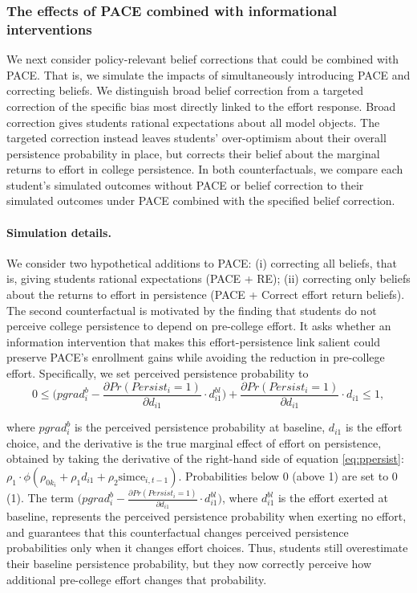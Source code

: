 \subsubsection{The effects of PACE combined with informational interventions}\label{sec:infointerventions}
We next consider policy-relevant belief corrections that could be combined with PACE. That is, we simulate the impacts of simultaneously introducing PACE and correcting beliefs. We distinguish broad belief correction from a targeted correction of the specific bias most directly linked to the effort response. Broad correction gives students rational expectations about all model objects. The targeted correction instead leaves students' over-optimism about their overall persistence probability in place, but corrects their belief about the marginal returns to effort in college persistence. In both counterfactuals, we compare each student's simulated outcomes without PACE or belief correction to their simulated outcomes under PACE combined with the specified belief correction.\par


\vspace{-1em}
\paragraph{Simulation details.} We consider two hypothetical additions to PACE: (i) correcting all beliefs, that is, giving students rational expectations (PACE + RE); (ii) correcting only beliefs about the returns to effort in persistence (PACE + Correct effort return beliefs). The second counterfactual is motivated by the finding that students do not perceive college persistence to depend on pre-college effort.  It asks whether an information intervention that makes this effort-persistence link salient could preserve PACE's enrollment gains while avoiding the reduction in pre-college effort. Specifically, we set perceived persistence probability to
$$0\leq \bigg(pgrad^b_i-\frac{\partial Pr(Persist_i=1) }{\partial d_{i1}}\cdot d_{i1}^{bl}\bigg)+\frac{\partial Pr(Persist_i=1) }{\partial d_{i1}}\cdot d_{i1} \leq1,$$ 

\noindent where $pgrad^b_i$ is the perceived persistence probability at baseline, $d_{i1}$ is the effort choice, and the derivative is the true marginal effect of effort on persistence, obtained by taking the derivative of the right-hand side of equation \eqref{eq:ppersist}: $\rho_1 \cdot \phi(\rho_{0k_i}+\rho_1 d_{i1}+\rho_2 \mbox{simce}_{i,t-1})$. Probabilities below 0 (above 1) are set to 0 (1). The term $\bigg(pgrad_i^b-\frac{\partial Pr(Persist_i=1) }{\partial d_{i1}}\cdot d_{i1}^{bl} \bigg)$, where $d_{i1}^{bl} $ is the effort exerted at baseline, represents the perceived persistence probability when exerting no effort, and guarantees that this counterfactual changes perceived persistence probabilities only when it changes effort choices. Thus, students still overestimate their baseline persistence probability, but they now correctly perceive how additional pre-college effort changes that probability.\par 


